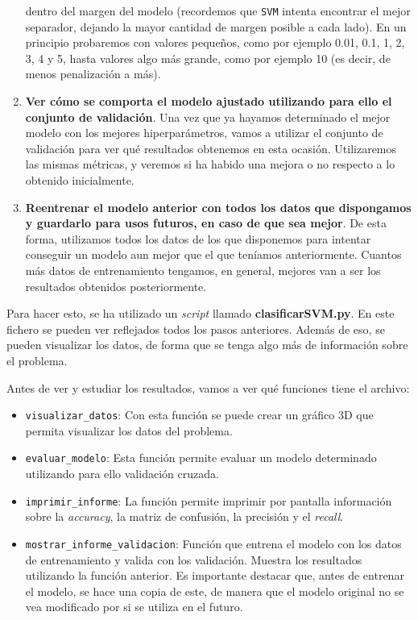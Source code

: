 \documentclass[11pt,a4paper]{article}
\begin{document}
\begin{enumerate}
	dentro del margen del modelo (recordemos que \texttt{SVM} intenta encontrar el mejor separador,
	dejando la mayor cantidad de margen posible a cada lado). En un principio probaremos con valores
	pequeños, como por ejemplo 0.01, 0.1, 1, 2, 3, 4 y 5, hasta valores algo más grande, como por
	ejemplo 10 (es decir, de menos penalización a más).
	\item \textbf{Ver cómo se comporta el modelo ajustado utilizando para ello el conjunto de validación}.
	Una vez que ya hayamos determinado el mejor modelo con los mejores hiperparámetros, vamos a
	utilizar el conjunto de validación para ver qué resultados obtenemos en esta ocasión. Utilizaremos
	las mismas métricas, y veremos si ha habido una mejora o no respecto a lo obtenido inicialmente.
	\item \textbf{Reentrenar el modelo anterior con todos los datos que dispongamos y guardarlo para
	usos futuros, en caso de que sea mejor}. De esta forma, utilizamos todos los datos de los que
	disponemos para intentar conseguir un modelo aun mejor que el que teníamos anteriormente.
	Cuantos más datos de entrenamiento tengamos, en general, mejores van a ser los resultados
	obtenidos posteriormente.
\end{enumerate}

Para hacer esto, se ha utilizado un \textit{script} llamado \textbf{clasificarSVM.py}.
En este fichero se pueden ver reflejados todos los pasos anteriores. Además de eso,
se pueden visualizar los datos, de forma que se tenga algo más de información sobre el problema.

Antes de ver y estudiar los resultados, vamos a ver qué funciones tiene el archivo:

\begin{itemize}[label=\textbullet]
	\item \texttt{visualizar\_datos}: Con esta función se puede crear un gráfico 3D
	que permita visualizar los datos del problema.
	\item \texttt{evaluar\_modelo}: Esta función permite evaluar un modelo determinado
	utilizando para ello validación cruzada.
	\item \texttt{imprimir\_informe}: La función permite imprimir por pantalla información sobre la
	\textit{accuracy}, la matriz de confusión, la precisión y el \textit{recall}.
	\item \texttt{mostrar\_informe\_validacion}: Función que entrena el modelo con
	los datos de entrenamiento y valida con los validación. Muestra los resultados
	utilizando la función anterior. Es importante destacar que, antes de entrenar el
	modelo, se hace una copia de este, de manera que el modelo original no se vea
	modificado por si se utiliza en el futuro.
\end{itemize}
\end{document}
